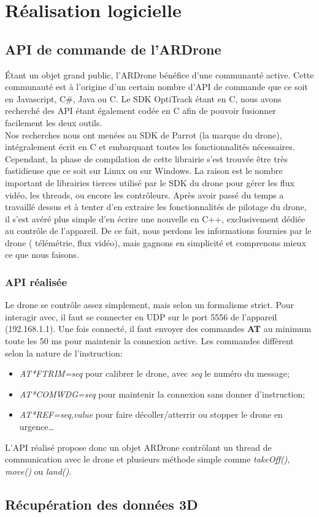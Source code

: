 \chapter{Réalisation logicielle}
    \section{API de commande de l'ARDrone}
        Étant un objet grand public, l'ARDrone bénéfice d'une communauté active. Cette communauté est à l'origine d'un certain nombre d'API de commande que ce soit en Javascript, C\#, Java ou C. Le SDK OptiTrack étant en C, nous avons recherché des API étant également codée en C afin de pouvoir fusionner facilement les deux outils.\\

        Nos recherches nous ont menées au SDK de Parrot (la marque du drone), intégralement écrit en C et embarquant toutes les fonctionnalités nécessaires. Cependant, la phase de compilation de cette librairie s'est trouvée être très fastidieuse que ce soit sur Linux ou sur Windows. La raison est le nombre important de librairies tierces utilisé par le SDK du drone pour gérer les flux vidéo, les threads, ou encore les contrôleurs. Après avoir passé du temps a travaillé dessus et à tenter d'en extraire les fonctionnalités de pilotage du drone, il s'est avéré plus simple d'en écrire une nouvelle en C++, exclusivement dédiée au contrôle de l'appareil. De ce fait, nous perdons les informations fournies par le drone ( télémétrie, flux vidéo), mais gagnons en simplicité et comprenons mieux ce que nous faisons.

    \subsection{API réalisée}
        Le drone se contrôle assez simplement, mais selon un formalisme strict. Pour interagir avec, il faut se connecter en UDP sur le port 5556 de l'appareil (192.168.1.1). Une fois connecté, il faut envoyer des commandes \textbf{AT} au minimum toute les 50 ms pour maintenir la connexion active. Les commandes diffèrent selon la nature de l'instruction:
        \begin{itemize}
            \item \textit{AT*FTRIM=seq} pour calibrer le drone, avec \textit{seq} le numéro du message;
            \item \textit{AT*COMWDG=seq} pour maintenir la connexion sans donner d'instruction;
            \item \textit{AT*REF=seq,value} pour faire décoller/atterrir ou stopper le drone en urgence…
        \end{itemize}
        L'API réalisé propose donc un objet ARDrone contrôlant un thread de communication avec le drone et plusieurs méthode simple comme \textit{takeOff()}, \textit{move()} ou \textit{land()}.

    \section{Récupération des données 3D}
